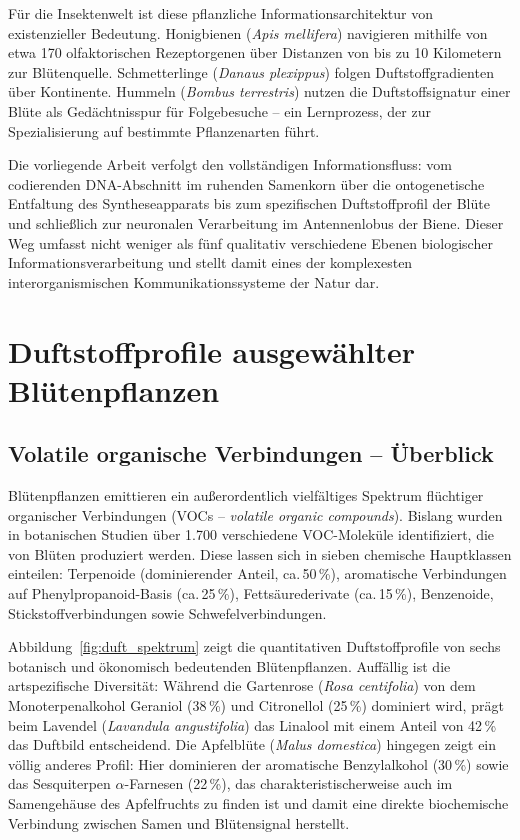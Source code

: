 \documentclass[12pt,a4paper]{article}
\begin{document}
F\"ur die Insektenwelt ist diese pflanzliche Informationsarchitektur von existenzieller Bedeutung. Honigbienen (\textit{Apis mellifera}) navigieren mithilfe von etwa 170 olfaktorischen Rezeptorgenen \"uber Distanzen von bis zu 10 Kilometern zur Bl\"utenquelle. Schmetterlinge (\textit{Danaus plexippus}) folgen Duftstoffgradienten \"uber Kontinente. Hummeln (\textit{Bombus terrestris}) nutzen die Duftstoffsignatur einer Bl\"ute als Ged\"achtnisspur f\"ur Folgebesuche -- ein Lernprozess, der zur Spezialisierung auf bestimmte Pflanzenarten f\"uhrt.

Die vorliegende Arbeit verfolgt den vollst\"andigen Informationsfluss: vom codierenden DNA-Abschnitt im ruhenden Samenkorn \"uber die ontogenetische Entfaltung des Syntheseapparats bis zum spezifischen Duftstoffprofil der Bl\"ute und schlie{\ss}lich zur neuronalen Verarbeitung im Antennenlobus der Biene. Dieser Weg umfasst nicht weniger als f\"unf qualitativ verschiedene Ebenen biologischer Informationsverarbeitung und stellt damit eines der komplexesten interorganismischen Kommunikationssysteme der Natur dar.

\section{Duftstoffprofile ausgew\"ahlter Bl\"utenpflanzen}

\subsection{Volatile organische Verbindungen -- \"Uberblick}

Bl\"utenpflanzen emittieren ein au{\ss}erordentlich vielf\"altiges Spektrum fl\"uchtiger organischer Verbindungen (VOCs -- \textit{volatile organic compounds}). Bislang wurden in botanischen Studien \"uber 1.700 verschiedene VOC-Molek\"ule identifiziert, die von Bl\"uten produziert werden. Diese lassen sich in sieben chemische Hauptklassen einteilen: Terpenoide (dominierender Anteil, ca.\,50\,\%), aromatische Verbindungen auf Phenylpropanoid-Basis (ca.\,25\,\%), Fetts\"aurederivate (ca.\,15\,\%), Benzenoide, Stickstoffverbindungen sowie Schwefelverbindungen.

Abbildung~\ref{fig:duft_spektrum} zeigt die quantitativen Duftstoffprofile von sechs botanisch und \"okonomisch bedeutenden Bl\"utenpflanzen. Auff\"allig ist die artspezifische Diversit\"at: W\"ahrend die Gartenrose (\textit{Rosa centifolia}) von dem Monoterpenalkohol Geraniol (38\,\%) und Citronellol (25\,\%) dominiert wird, pr\"agt beim Lavendel (\textit{Lavandula angustifolia}) das Linalool mit einem Anteil von 42\,\% das Duftbild entscheidend. Die Apfelbl\"ute (\textit{Malus domestica}) hingegen zeigt ein v\"ollig anderes Profil: Hier dominieren der aromatische Benzylalkohol (30\,\%) sowie das Sesquiterpen $\alpha$-Farnesen (22\,\%), das charakteristischerweise auch im Samengeh\"ause des Apfelfruchts zu finden ist und damit eine direkte biochemische Verbindung zwischen Samen und Bl\"utensignal herstellt.
\end{document}

